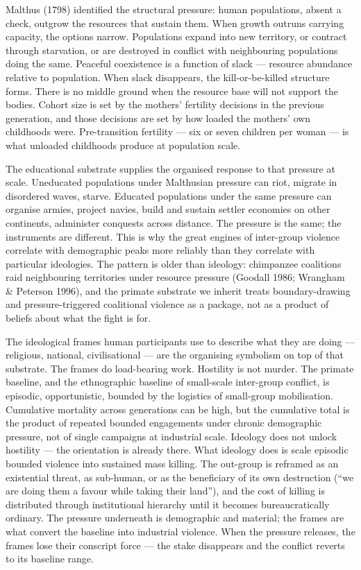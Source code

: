 \documentclass[12pt,letterpaper]{article}
\begin{document}
Malthus (1798) identified the structural pressure: human populations,
absent a check, outgrow the resources that sustain them. When growth
outruns carrying capacity, the options narrow. Populations expand into
new territory, or contract through starvation, or are destroyed in
conflict with neighbouring populations doing the same. Peaceful
coexistence is a function of slack --- resource abundance relative to
population. When slack disappears, the kill-or-be-killed structure
forms. There is no middle ground when the resource base will not
support the bodies. Cohort size is set by the mothers' fertility
decisions in the previous generation, and those decisions are set
by how loaded the mothers' own childhoods were. Pre-transition
fertility --- six or seven children per woman --- is what unloaded
childhoods produce at population scale.

The educational substrate supplies the organised response to that
pressure at scale. Uneducated populations under Malthusian pressure can
riot, migrate in disordered waves, starve. Educated populations under
the same pressure can organise armies, project navies, build and
sustain settler economies on other continents, administer conquests
across distance. The pressure is the same; the instruments are
different. This is why the great engines of inter-group violence
correlate with demographic peaks more reliably than they correlate with
particular ideologies. The pattern is older than ideology: chimpanzee
coalitions raid neighbouring territories under resource pressure
(Goodall 1986; Wrangham \& Peterson 1996), and the primate
substrate we inherit treats boundary-drawing and pressure-triggered
coalitional violence as a package, not as a product of beliefs about
what the fight is for.

The ideological frames human
participants use to describe what they are doing --- religious,
national, civilisational --- are the organising symbolism on top of
that substrate. The frames do load-bearing work. Hostility is not
murder. The primate baseline, and the ethnographic baseline of
small-scale inter-group conflict, is episodic, opportunistic, bounded
by the logistics of small-group mobilisation. Cumulative mortality
across generations can be high, but the cumulative total is the
product of repeated bounded engagements under chronic demographic
pressure, not of single campaigns at industrial scale. Ideology does
not unlock hostility --- the orientation is already there. What
ideology does is scale episodic bounded violence into sustained mass
killing. The out-group is reframed as an existential
threat, as sub-human, or as the beneficiary of its own destruction
(``we are doing them a favour while taking their land''), and the cost
of killing is distributed through institutional hierarchy until it
becomes bureaucratically ordinary. The pressure underneath is
demographic and material; the frames are what convert the baseline into
industrial violence. When the pressure releases, the frames lose their
conscript force --- the stake disappears and the conflict reverts to
its baseline range.
\end{document}
